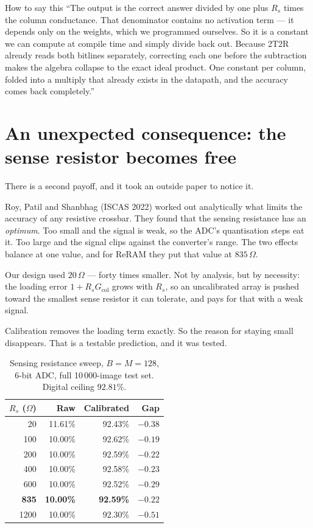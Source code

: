 \documentclass[11pt,a4paper]{report}
\begin{document}
\begin{saybox}{How to say this}
``The output is the correct answer divided by one plus $R_s$ times the column
conductance. That denominator contains no activation term --- it depends only
on the weights, which we programmed ourselves. So it is a constant we can
compute at compile time and simply divide back out. Because 2T2R already reads
both bitlines separately, correcting each one before the subtraction makes the
algebra collapse to the exact ideal product. One constant per column, folded
into a multiply that already exists in the datapath, and the accuracy comes
back completely.''
\end{saybox}

\section{An unexpected consequence: the sense resistor becomes free}
\label{sec:rsensefree}

There is a second payoff, and it took an outside paper to notice it.

Roy, Patil and Shanbhag (ISCAS 2022) worked out analytically what limits the
accuracy of any resistive crossbar. They found that the sensing resistance has
an \emph{optimum}. Too small and the signal is weak, so the ADC's quantisation
steps eat it. Too large and the signal clips against the converter's range.
The two effects balance at one value, and for ReRAM they put that value at
$835\,\Omega$.

Our design used $20\,\Omega$ --- forty times smaller. Not by analysis, but by
necessity: the loading error $1+R_s G_{\mathrm{col}}$ grows with $R_s$, so an
uncalibrated array is pushed toward the smallest sense resistor it can
tolerate, and pays for that with a weak signal.

Calibration removes the loading term exactly. So the reason for staying small
disappears. That is a testable prediction, and it was tested.

\begin{table}[h]
\centering
\caption{Sensing resistance sweep, $B{=}M{=}128$, 6-bit ADC, full 10\,000-image
test set. Digital ceiling $92.81\%$.}
\begin{tabular}{rrrr}
\toprule
$R_s$ ($\Omega$) & Raw & Calibrated & Gap \\
\midrule
20   & 11.61\% & 92.43\% & $-0.38$ \\
100  & 10.00\% & 92.62\% & $-0.19$ \\
200  & 10.00\% & 92.59\% & $-0.22$ \\
400  & 10.00\% & 92.58\% & $-0.23$ \\
600  & 10.00\% & 92.52\% & $-0.29$ \\
\textbf{835} & \textbf{10.00\%} & \textbf{92.59\%} & $\mathbf{-0.22}$ \\
1200 & 10.00\% & 92.30\% & $-0.51$ \\
\bottomrule
\end{tabular}
\end{table}
\end{document}
